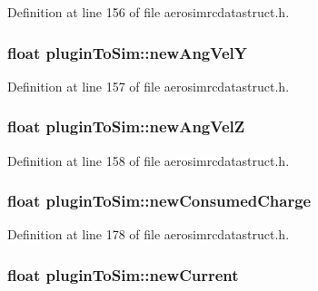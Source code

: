 \-Definition at line 156 of file aerosimrcdatastruct.\-h.

\hypertarget{group___aero_sim_r_c_gafe0593ec5f2487320a352c0f8bcb2f2d}{
\subsubsection[{new\-Ang\-Vel\-Y}]{\setlength{\rightskip}{0pt plus 5cm}float {\bf plugin\-To\-Sim\-::new\-Ang\-Vel\-Y}}}\label{group___aero_sim_r_c_gafe0593ec5f2487320a352c0f8bcb2f2d}


\-Definition at line 157 of file aerosimrcdatastruct.\-h.

\hypertarget{group___aero_sim_r_c_ga6e895029ebb998be74c53cea057e83cf}{
\subsubsection[{new\-Ang\-Vel\-Z}]{\setlength{\rightskip}{0pt plus 5cm}float {\bf plugin\-To\-Sim\-::new\-Ang\-Vel\-Z}}}\label{group___aero_sim_r_c_ga6e895029ebb998be74c53cea057e83cf}


\-Definition at line 158 of file aerosimrcdatastruct.\-h.

\hypertarget{group___aero_sim_r_c_gabb6455cde42e82e713838307779ab4f7}{
\subsubsection[{new\-Consumed\-Charge}]{\setlength{\rightskip}{0pt plus 5cm}float {\bf plugin\-To\-Sim\-::new\-Consumed\-Charge}}}\label{group___aero_sim_r_c_gabb6455cde42e82e713838307779ab4f7}


\-Definition at line 178 of file aerosimrcdatastruct.\-h.

\hypertarget{group___aero_sim_r_c_ga7fd515830d601c3785dadd02ed64dcc0}{
\subsubsection[{new\-Current}]{\setlength{\rightskip}{0pt plus 5cm}float {\bf plugin\-To\-Sim\-::new\-Current}}}\label{group___aero_sim_r_c_ga7fd515830d601c3785dadd02ed64dcc0}


